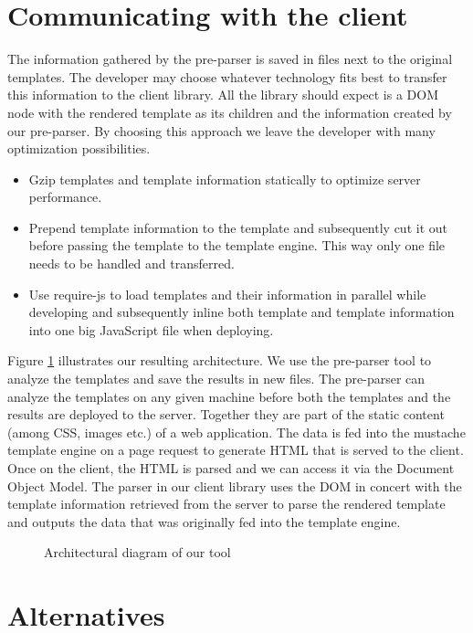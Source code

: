 \documentclass[thesis.tex]{subfiles}
\begin{document}
\section{Communicating with the client}

The information gathered by the pre-parser is saved in files next to the
original templates. The developer may choose whatever technology fits best to
transfer this information to the client library. All the library should expect
is a DOM node with the rendered template as its children and the information
created by our pre-parser.
By choosing this approach we leave the developer with many optimization
possibilities.
\begin{itemize}
\item Gzip templates and template information statically to optimize
	server performance.
\item Prepend template information to the template and subsequently
	cut it out before passing the template to the template engine.
	This way only one file needs to be handled and transferred.
\item Use require-js to load templates and their information in parallel
	while developing and subsequently inline both template and
	template information into one big JavaScript file when deploying.
\end{itemize}

Figure \ref{fig:architecture} illustrates our resulting architecture.
We use the pre-parser tool to analyze the templates and save the results in new
files. The pre-parser can analyze the templates on any given machine before
both the templates and the results are deployed to the server. Together they
are part of the static content (among CSS, images etc.) of a web application.
The data is fed into the mustache template engine on a page request to generate
HTML that is served to the client. Once on the client, the HTML is parsed and we
can access it via the Document Object Model. The parser in our client library
uses the DOM in concert with the template information retrieved from the server
to parse the rendered template and outputs the data that was originally fed into
the template engine.
\begin{figure}
	\centering
	\resizebox{\linewidth}{!}{}
	\caption{Architectural diagram of our tool}
	\label{fig:architecture}
\end{figure}

\section{Alternatives}
\end{document}
